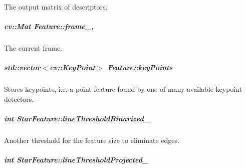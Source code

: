 The output matrix of descriptors. 

\hypertarget{group___feature_extractor_aa805e6fee8eeec2061feabe29430f0df}{
\subparagraph[{frame\-\_\-}]{\setlength{\rightskip}{0pt plus 5cm}cv\-::\-Mat Feature\-::frame\-\_\-\hspace{0.3cm}{\ttfamily [protected]}, {\ttfamily [inherited]}}}\label{group___feature_extractor_aa805e6fee8eeec2061feabe29430f0df}


The current frame. 

\hypertarget{group___feature_extractor_ac666ae973c3840be1b3b9183dd12b8c1}{
\subparagraph[{key\-Points}]{\setlength{\rightskip}{0pt plus 5cm}std\-::vector$<$cv\-::\-Key\-Point$>$ Feature\-::key\-Points\hspace{0.3cm}{\ttfamily [inherited]}}}\label{group___feature_extractor_ac666ae973c3840be1b3b9183dd12b8c1}


Stores keypoints, i.\-e. a point feature found by one of many available keypoint detectors. 

\hypertarget{group___feature_extractor_aea296c8f5cdf67ae340aac32f9512906}{
\subparagraph[{line\-Threshold\-Binarized\-\_\-}]{\setlength{\rightskip}{0pt plus 5cm}int Star\-Feature\-::line\-Threshold\-Binarized\-\_\-\hspace{0.3cm}{\ttfamily [private]}}}\label{group___feature_extractor_aea296c8f5cdf67ae340aac32f9512906}


Another threshold for the feature size to eliminate edges. 

\hypertarget{group___feature_extractor_ab01cd66c7c27def6dcf03915c83085ad}{
\subparagraph[{line\-Threshold\-Projected\-\_\-}]{\setlength{\rightskip}{0pt plus 5cm}int Star\-Feature\-::line\-Threshold\-Projected\-\_\-\hspace{0.3cm}{\ttfamily [private]}}}\label{group___feature_extractor_ab01cd66c7c27def6dcf03915c83085ad}


